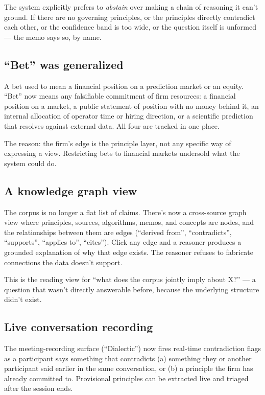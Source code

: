 \documentclass[11pt]{article}
\begin{document}
The system explicitly prefers to \emph{abstain} over making a
chain of reasoning it can't ground. If there are no governing
principles, or the principles directly contradict each other, or
the confidence band is too wide, or the question itself is
unformed — the memo says so, by name.

\subsection{``Bet'' was generalized}

A bet used to mean a financial position on a prediction market or
an equity. ``Bet'' now means any falsifiable commitment of firm
resources: a financial position on a market, a public statement of
position with no money behind it, an internal allocation of
operator time or hiring direction, or a scientific prediction that
resolves against external data. All four are tracked in one place.

The reason: the firm's edge is the principle layer, not any
specific way of expressing a view. Restricting bets to financial
markets undersold what the system could do.

\subsection{A knowledge graph view}

The corpus is no longer a flat list of claims. There's now a
cross-source graph view where principles, sources, algorithms,
memos, and concepts are nodes, and the relationships between them
are edges (``derived from'', ``contradicts'', ``supports'',
``applies to'', ``cites''). Click any edge and a reasoner produces
a grounded explanation of why that edge exists. The reasoner
refuses to fabricate connections the data doesn't support.

This is the reading view for ``what does the corpus jointly imply
about X?'' — a question that wasn't directly answerable before,
because the underlying structure didn't exist.

\subsection{Live conversation recording}

The meeting-recording surface (``Dialectic'') now fires real-time
contradiction flags as a participant says something that
contradicts (a) something they or another participant said earlier
in the same conversation, or (b) a principle the firm has already
committed to. Provisional principles can be extracted live and
triaged after the session ends.
\end{document}

